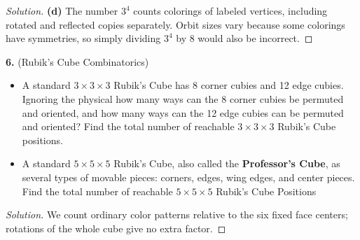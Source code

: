 \documentclass[12pt]{amsart}
\newenvironment{solution}
{\begin{proof}[Solution]}
{\end{proof}}
\begin{document}
\begin{onehalfspace}
\begin{solution}
            \textbf{(d)} The number $3^4$ counts colorings of labeled
            vertices, including rotated and reflected copies separately.
            Orbit sizes vary because some colorings have symmetries,
            so simply dividing $3^4$ by $8$ would also be incorrect.
        \end{solution}

        \noindent\textbf{6.} (Rubik's Cube Combinatorics)
        \begin{itemize}
            \item[(a)] A standard $3\times 3\times 3$ Rubik's Cube has 8 corner cubies and 12 edge
            cubies.
            Ignoring the physical how many ways can the 8 corner cubies be permuted and oriented, and
            how many ways can the 12 edge cubies can be permuted and oriented?
            Find the total number of reachable $3\times 3\times 3$ Rubik's Cube positions.
            \item[(b)] A standard $5\times 5\times 5$ Rubik's Cube, also called the
            \textbf{Professor's Cube}, as several types of movable pieces: corners, edges, wing edges,
            and center pieces.
            Find the total number of reachable $5\times 5\times 5$ Rubik's Cube Positions
        \end{itemize}

        \begin{solution}
            We count ordinary color patterns relative to the six fixed
            face centers; rotations of the whole cube give no extra factor.


\end{solution}
\end{onehalfspace}
\end{document}
